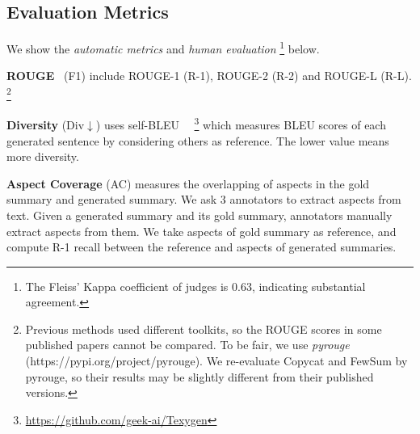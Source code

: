 \subsection{Evaluation Metrics}
We show the {\em automatic metrics}
and {\em human evaluation} \footnote{The Fleiss' Kappa coefficient of judges is 0.63, indicating substantial agreement.}
below.


\textbf{ROUGE}~\cite{rouge}
(F1) include
ROUGE-1 (R-1), ROUGE-2 (R-2) and
ROUGE-L (R-L). 
\footnote{
Previous methods used different toolkits,
so the ROUGE scores in some published papers cannot be compared.
To be fair, we use {\em pyrouge} (https://pypi.org/project/pyrouge).
We re-evaluate Copycat and FewSum by pyrouge,
so their results may be slightly different from 
their published versions.}

\textbf{Diversity} (Div$\downarrow$) uses self-BLEU~\cite{SelfBleu18}
~\footnote{\url{https://github.com/geek-ai/Texygen}}
which measures BLEU scores of each generated sentence by considering others as reference. 
The lower value means more diversity.

\textbf{Aspect Coverage} (AC) measures the overlapping of aspects in the gold summary and generated summary.
We ask $3$ annotators to extract aspects from text. 
Given a generated summary and its gold summary,
annotators manually extract aspects from them.
We take aspects of gold summary as reference,
and compute R-1 recall between the reference  
and aspects of generated summaries.

